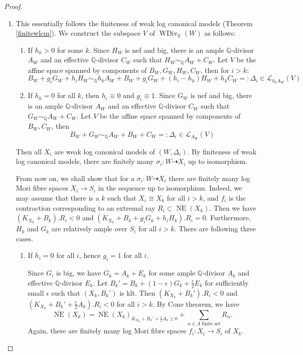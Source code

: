 \documentclass[11pt]{amsart}
\begin{document}
\begin{proof}
\begin{enumerate}
  \item This essentially follows the finiteness of weak log canonical models (Theorem \ref{finitewlcm}). We construct the subspace $V$ of $\operatorname{WDiv}_{\mathbb{R}}(W)$ as follows: 
\begin{enumerate}
\item If $h_{k}>0$ for some $k$. Since $H_{W}$ is nef and big,  there is an  ample $\mathbb{Q}$-divisor $A_{W}$ and an effective $\mathbb{Q}$-divisor $C_{W}$  such that $H_{W}\sim_{\mathbb{Q}}A_{W}+C_{W}$. Let $V$ be the affine space spanned by components of  $B_{W},G_{W},H_{W},C_{W}$, then for $i>k$:
    \[
      B_{W}+g_{i}G_{W}+h_{i}H_{W}\sim_{\mathbb{Q}} h_{k}A_{W}+B_{W}+g_{i}G_{W}+(h_{i}-h_{k})H_{W}+h_{k}C_{W}=:\Delta_{i} \in \mathcal{L}_{h_{k}A_{W}}(V)
    \]
  \item If $h_{k}=0$ for all $k$, then $h_{i}\equiv 0$ and $g_{i}\equiv 1$.  Since $G_{W}$ is nef and big,  there is  an  ample $\mathbb{Q}$-divisor $A_{W}$ and an effective $\mathbb{Q}$-divisor $C_{W}$  such that $G_{W}\sim_{\mathbb{Q}}A_{W}+C_{W}$. Let $V$ be the affine space spanned by components of  $B_{W},C_{W}$, then 
    \[
      B_{W}+G_{W}\sim_{\mathbb{Q}} A_{W}+B_{W}+C_{W}=:\Delta_{i} \in \mathcal{L}_{A_{W}}(V)
    \]
\end{enumerate}
Then all $X_{i}$ are weak log canonical models of $(W,\Delta_{i})$. By finiteness of weak log canonical models, there are finitely many $\sigma_{i}:W\dashrightarrow X_{i}$ up to isomorphism. 

From now on, we shall show that for a $\sigma_{i}:W\dashrightarrow X_{i}$ there are finitely many log Mori fibre spaces $X_i\to S_i$ in the sequence up to isomorphism. 
Indeed, we may assume that there is a $k$ such that $X_{i} \cong X_{k}$ for all $i>k$, and  $f_{i}$ is the contraction corresponding to an extremal ray $R_{i} \subset \overline{\operatorname{NE}}(X_{k}) $. Then we have $(K_{X_{k}}+B_{k}).R_{i}<0  $ and $(K_{X_{k}}+B_{k}+g_{i}G_{k}+h_{i}H_{k}).R_{i}=0$. Furthermore, $H_{k}$ and $G_{k}$ are relatively ample over $S_{i}$ for all $i>k$. There are following three cases.


\begin{enumerate}
\item If $h_{i}=0$ for all $i$, hence $g_{i}=1$ for all $i$. 

Since $G_{i}$ is big, we have $G_{k}=A_{k}+E_{k}$ for some ample $\mathbb{Q}$-divisor $A_{k}$ and effective $\mathbb{Q}$-divisor $E_{k}$. Let $B_{k}'=B_{k}+(1-\epsilon)G_{k}+\frac{\epsilon}{2} E_{k}$ for sufficiently small $\epsilon$ such that $(X_{k},B_{k}')$ is klt. Then $(K_{X_{k}}+B_{k}').R_{i}<0$ and $(K_{X_{k}}+B_{k}'+\frac{\epsilon}{2} A_{k}).R_{i}<0$ for all $i>k$. By Cone theorem, we have 
\[
    \overline{\operatorname{NE}}(X_{k})=\overline{\operatorname{NE}}(X_{k})_{K_{X_{k}}+B_{k}'+\frac{\epsilon}{2}A_{k}\geqslant 0} +\sum_{\alpha \in\Lambda\text{ finite set}}R_{\alpha}.
  \]
  Again, there are finitely many log Mori fibre spaces $f_{i}:X_{i}\to S_{i}$ of $X_{k}$.


\end{enumerate}
\end{enumerate}
\end{proof}
\end{document}
